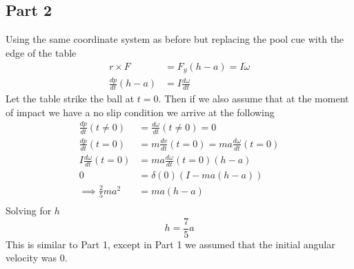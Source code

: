 \subsection{Part 2}
Using the same coordinate system as before but replacing the pool cue with the edge of the table
\begin{equation}
\begin{split}
    r \times F &= F_y (h-a) = I \dot{\omega} \\
    \frac{dp}{dt}(h-a) &= I\frac{d\omega}{dt}
\end{split}
\end{equation}
Let the table strike the ball at $t=0$. Then if we also assume that at the moment of impact we have a no slip condition we arrive at the following
\begin{equation}
    \begin{split}
        \frac{dp}{dt}(t \neq 0) &= \frac{d\omega}{dt}(t \neq 0) = 0\\
        \frac{dp}{dt}(t = 0) &= m \frac{dv}{dt}(t = 0) = ma \frac{d\omega}{dt}(t=0)\\
        I \frac{d\omega}{dt}(t=0) &= ma \frac{d\omega}{dt}(t=0)(h-a)\\
        0 &= \delta(0)(I-ma(h-a))\\
        \implies \frac{2}{5}ma^2 &= ma(h-a)\\
    \end{split}
\end{equation}
Solving for $h$
\begin{equation}
    h = \frac{7}{5}a
\end{equation}
This is similar to Part 1, except in Part 1 we assumed that the initial angular velocity was $0$.